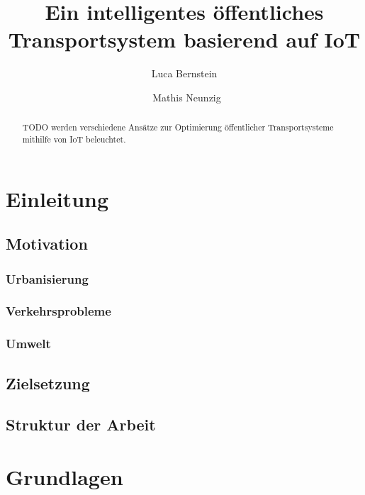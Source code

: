 \documentclass[ngerman]{seminarbeitrag} %
\begin{document}
\title{Ein intelligentes öffentliches Transportsystem basierend auf IoT}
\author{Luca Bernstein\and\ Mathis Neunzig}

\maketitle %

\setcounter{tocdepth}{2}
\tableofcontents{}
\newpage

\begin{abstract}
TODO werden verschiedene Ansätze zur Optimierung öffentlicher Transportsysteme mithilfe von IoT beleuchtet.

\end{abstract}

\pagebreak
\section{Einleitung}
\subsection{Motivation}
\subsubsection{Urbanisierung}
\subsubsection{Verkehrsprobleme}
\subsubsection{Umwelt}
\subsection{Zielsetzung}
\subsection{Struktur der Arbeit}

\pagebreak
\section{Grundlagen}
\end{document}
